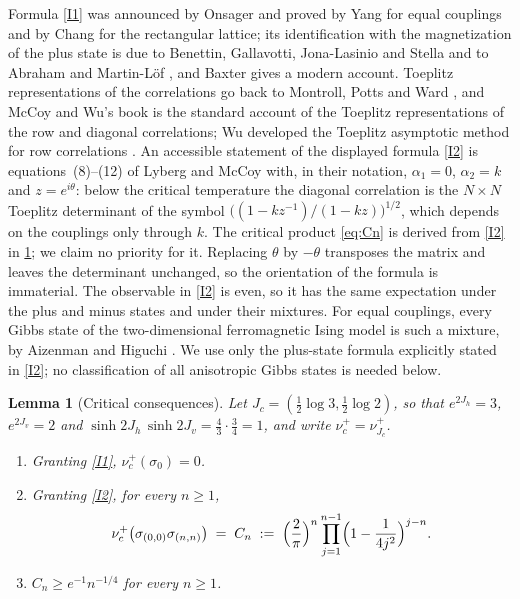 \documentclass[11pt]{article}
\theoremstyle{plain}
\newtheorem{lemma}[theorem]{Lemma}
\theoremstyle{definition}
\theoremstyle{remark}
\begin{document}
Formula \ref{I1} was announced by Onsager and proved by Yang \cite{Yang52} for equal couplings and by Chang \cite{Chang52} for the rectangular lattice; its identification with the magnetization of the plus state is due to Benettin, Gallavotti, Jona-Lasinio and Stella \cite{BGJS73} and to Abraham and Martin-L\"of \cite{AML73}, and Baxter \cite{Baxter11} gives a modern account. Toeplitz representations of the correlations go back to Montroll, Potts and Ward \cite{MPW63}, and McCoy and Wu's book \cite{MW73} is the standard account of the Toeplitz representations of the row and diagonal correlations; Wu developed the Toeplitz asymptotic method for row correlations \cite{Wu66}. An accessible statement of the displayed formula \ref{I2} is equations~(8)--(12) of Lyberg and McCoy \cite{LyM07} with, in their notation, $\alpha_1=0$, $\alpha_2=k$ and $z=e^{i\theta}$: below the critical temperature the diagonal correlation is the $N\times N$ Toeplitz determinant of the symbol $\bigl((1-kz^{-1})/(1-kz)\bigr)^{1/2}$, which depends on the couplings only through $k$. The critical product \eqref{eq:Cn} is derived from \ref{I2} in \cref{lem:ising}; we claim no priority for it. Replacing $\theta$ by $-\theta$ transposes the matrix and leaves the determinant unchanged, so the orientation of the formula is immaterial. The observable in \ref{I2} is even, so it has the same expectation under the plus and minus states and under their mixtures. For equal couplings, every Gibbs state of the two-dimensional ferromagnetic Ising model is such a mixture, by Aizenman \cite{Aiz80} and Higuchi \cite{Hig81}. We use only the plus-state formula explicitly stated in \ref{I2}; no classification of all anisotropic Gibbs states is needed below.

\begin{lemma}[Critical consequences]
\label{lem:ising}
Let $J_c=(\frac12\log3,\frac12\log2)$, so that $e^{2J_h}=3$, $e^{2J_v}=2$ and $\sinh2J_h\,\sinh2J_v=\frac43\cdot\frac34=1$, and write $\nu^+_c=\nu^+_{J_c}$.
\begin{enumerate}[label=(\alph*)]
\item\label{it:i1} Granting \ref{I1}, $\nu^+_c(\sigma_0)=0$.
\item\label{it:i2} Granting \ref{I2}, for every $n\ge1$,
\begin{equation}
\nu^+_c\bigl(\sigma_{(0,0)}\sigma_{(n,n)}\bigr)\;=\;C_n\;:=\;\Bigl(\frac2\pi\Bigr)^n\prod_{j=1}^{n-1}\Bigl(1-\frac1{4j^2}\Bigr)^{j-n}.
\label{eq:Cn}
\end{equation}
\item\label{it:i3} $C_n\ge e^{-1}n^{-1/4}$ for every $n\ge1$.
\end{enumerate}
\end{lemma}
\end{document}
